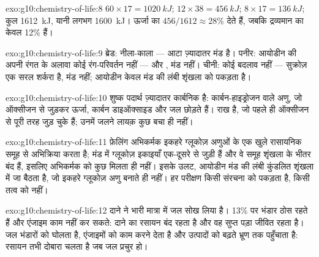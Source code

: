 \begin{solution}{exo:g10:chemistry-of-life:8}
 $60 \times 17 = \qty{1020}{kJ}$;  $12 \times 38 =
\qty{456}{kJ}$;  $8 \times 17 = \qty{136}{kJ}$; कुल
\qty{1612}{kJ}, यानी लगभग \qty{1600}{kJ}।  ऊर्जा का $456/1612 \approx
28\%$ देते हैं, जबकि द्रव्यमान का केवल 12\% हैं।
\end{solution}

\begin{solution}{exo:g10:chemistry-of-life:9}
ब्रेड: नीला-काला --- आटा ज़्यादातर मंड है। पनीर: आयोडीन की अपनी रंगत के
अलावा कोई रंग-परिवर्तन नहीं ---  और , मंड नहीं। चीनी: कोई
बदलाव नहीं --- सुक्रोज़ एक सरल शर्करा है, मंड नहीं; आयोडीन केवल मंड की
लंबी शृंखला को पकड़ता है।
\end{solution}

\begin{solution}{exo:g10:chemistry-of-life:10}
शुष्क पदार्थ ज़्यादातर कार्बनिक है: कार्बन-हाइड्रोजन वाले अणु, जो
ऑक्सीजन से जुड़कर ऊर्जा, कार्बन डाइऑक्साइड और जल छोड़ते हैं। राख  है, जो पहले ही ऑक्सीजन से पूरी तरह जुड़ चुके हैं; उनमें जलने लायक़
कुछ बचा ही नहीं।
\end{solution}

\begin{solution}{exo:g10:chemistry-of-life:11}
फ़ेलिंग अभिकर्मक इकहरे ग्लूकोज़ अणुओं के एक खुले रासायनिक समूह से
अभिक्रिया करता है; मंड में ग्लूकोज़ इकाइयाँ एक-दूसरे से जुड़ी हैं और वे
समूह शृंखला के भीतर बंद हैं, इसलिए अभिकर्मक को कुछ मिलता ही नहीं।
इसके उलट, आयोडीन मंड की लंबी कुंडलित शृंखला में जा बैठता है, जो इकहरे
ग्लूकोज़ अणु बनाते ही नहीं। हर परीक्षण किसी संरचना को पकड़ता है, किसी
तत्व को नहीं।
\end{solution}

\begin{solution}{exo:g10:chemistry-of-life:12}
दाने ने भारी मात्रा में जल सोख लिया है। 13\% पर भंडार ठोस रहते हैं और
एंजाइम काम नहीं कर सकते: दाने का रसायन बंद रहता है और वह सुप्त पड़ा
जीवित रहता है। जल भंडारों को घोलता है, एंजाइमों को काम करने देता है और
उत्पादों को बढ़ते भ्रूण तक पहुँचाता है: रसायन तभी दोबारा चलता है जब जल
प्रचुर हो।
\end{solution}

